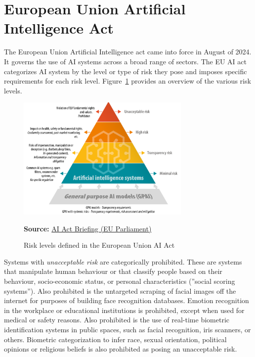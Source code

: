\section{European Union Artificial Intelligence Act}

The European Union Artificial Intelligence act came into force in August of 2024. It governs the use of AI systems across a broad range of sectors. The EU AI act categorizes AI system by the level or type of risk they pose and imposes specific requirements for each risk level. Figure~\ref{fig:euaiact} provides an overview of the various risk levels.

\begin{figure}
\centering
\includegraphics[width=0.75\textwidth]{screen2.png}

\vspace{\baselineskip}
\scriptsize \textbf{Source:} \href{https://www.europarl.europa.eu/RegData/etudes/BRIE/2021/698792/EPRS_BRI(2021)698792_EN.pdf}{AI Act Briefing (EU Parliament)}
\caption{Risk levels defined in the European Union AI Act}
\label{fig:euaiact}
\end{figure}

Systems with \emph{unacceptable risk} are categorically prohibited. These are systems that manipulate human behaviour or that classify people based on their behaviour, socio-economic status, or personal characteristics (''social scoring systems''). Also prohibited is the untargeted scraping of facial images off the internet for purposes of building face recognition databases. Emotion recognition in the workplace or educational institutions is prohibited, except when used for medical or safety reasons. Also prohibited is the use of real-time biometric identification systems in public spaces, such as facial recognition, iris scanners, or others. Biometric categorization to infer race, sexual orientation, political opinions or religious beliefs is also prohibited as posing an unacceptable risk. 

